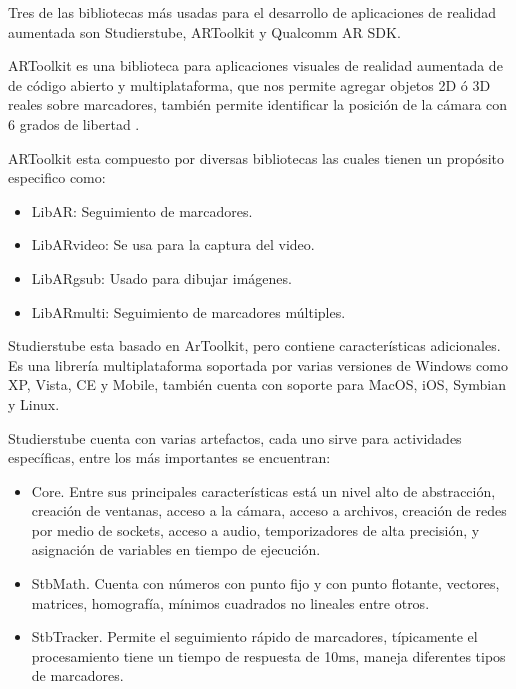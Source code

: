 \documentclass[12pt,a4paper,spanish,openany]{book}
\begin{document}
Tres de las bibliotecas más usadas para el desarrollo de aplicaciones de
realidad aumentada son Studierstube, ARToolkit y Qualcomm AR SDK.

ARToolkit es una biblioteca para aplicaciones visuales de realidad aumentada de
de código abierto y multiplataforma, que nos permite agregar objetos 2D ó 3D
reales sobre marcadores, también permite identificar la posición de la cámara
con 6 grados de libertad \cite{Azuma:2004:OAR:1103900.1103926}.

ARToolkit esta compuesto por diversas bibliotecas las cuales tienen un propósito
especifico como:

\begin{itemize}
  \item LibAR: Seguimiento de marcadores.
  \item LibARvideo: Se usa para la captura del video.
  \item LibARgsub:  Usado para dibujar imágenes.
  \item LibARmulti: Seguimiento de marcadores múltiples.
\end{itemize}



Studierstube esta basado en ArToolkit, pero contiene características
adicionales. Es una librería multiplataforma soportada por varias versiones
de Windows como XP, Vista, CE y Mobile, también cuenta con soporte para MacOS,
iOS, Symbian y Linux. \cite{StTbEs}

Studierstube cuenta con varias artefactos, cada uno sirve para actividades
específicas, entre los más importantes se encuentran:

\begin{itemize}  
\item Core.
Entre sus principales características está un nivel alto de abstracción,
creación de ventanas, acceso a la cámara, acceso a archivos, creación de redes
por medio de sockets, acceso a audio, temporizadores de alta precisión, y
asignación de variables en tiempo de ejecución.

\item StbMath.
Cuenta con números con punto fijo y con punto flotante, vectores,
matrices, homografía, mínimos cuadrados no lineales %
entre otros.

\item StbTracker.
Permite el seguimiento rápido de marcadores, típicamente el procesamiento tiene
un tiempo de respuesta de 10ms, maneja diferentes tipos de marcadores.
\end{itemize}
\end{document}
